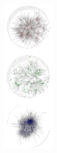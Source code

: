 \documentclass[table, usenames, svgnames, dvipsnames]{beamer}
\begin{document}
{%
\begin{frame}[plain]
	\begin{columns}[c]
			\hspace*{+0.5em}
			\includegraphics[height=7.90cm]{rede.jpg}
			\titlepage
	\end{columns}
	\addtocounter{framenumber}{-1}
\end{frame}
}
\end{document}
